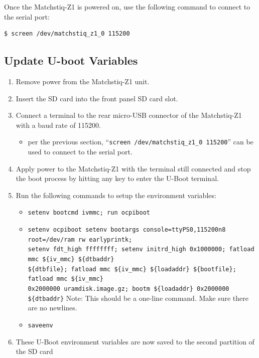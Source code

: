 \noindent Once the Matchstiq-Z1 is powered on, use the following command to connect to the serial port:
\begin{verbatim}
$ screen /dev/matchstiq_z1_0 115200
\end{verbatim}

\subsection{Update U-boot Variables}
\begin{enumerate}
\item Remove power from the Matchstiq-Z1 unit.
\item Insert the SD card into the front panel SD card slot.
\item Connect a terminal to the rear micro-USB connector of the Matchstiq-Z1 with a baud rate of 115200.
\begin{itemize}
\item per the previous section, ``\texttt{screen /dev/matchstiq\_z1\_0 115200}'' can be used to connect to the serial port.
\end{itemize}
\item Apply power to the Matchstiq-Z1 with the terminal still connected and stop the boot process by hitting any key to enter the U-Boot terminal.
\item Run the following commands to setup the environment variables:
\begin{itemize}
\item \texttt{setenv bootcmd \textquotesingle ivmmc; run ocpiboot\textquotesingle}
\item \texttt{setenv ocpiboot \textquotesingle setenv bootargs console=ttyPS0,115200n8 root=/dev/ram rw earlyprintk; \\
setenv fdt\_high ffffffff; setenv initrd\_high 0x1000000; fatload mmc \$\{iv\_mmc\} \$\{dtbaddr\}\\
\$\{dtbfile\}; fatload mmc \$\{iv\_mmc\} \$\{loadaddr\} \$\{bootfile\}; fatload mmc \$\{iv\_mmc\}\\
0x2000000 uramdisk.image.gz; bootm \$\{loadaddr\} 0x2000000 \$\{dtbaddr\}\textquotesingle}
\subitem *Note: This should be a one-line command. Make sure there are no newlines.
\item \texttt{saveenv}
\end{itemize}
\item These U-Boot environment variables are now saved to the second partition of the SD card
\end{enumerate}

